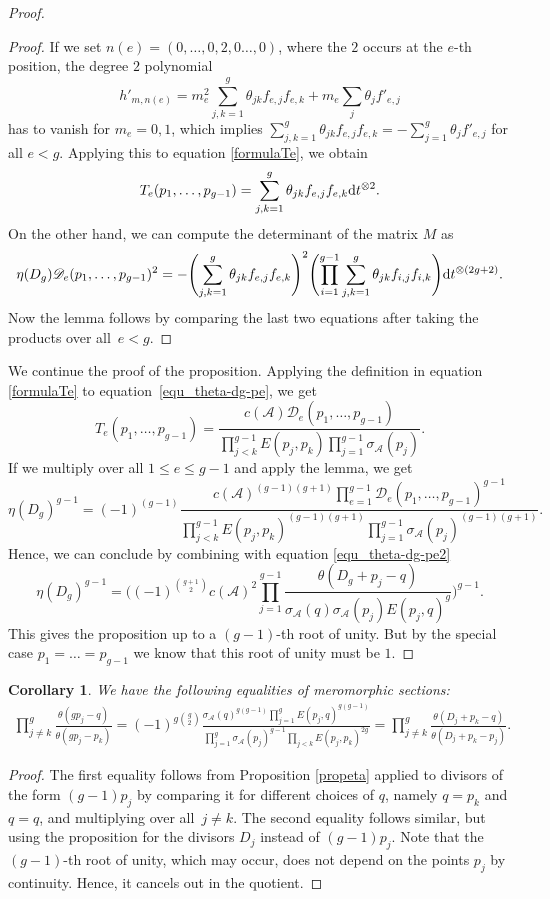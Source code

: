\documentclass[10pt,a4paper]{amsart}
\numberwithin{equation}{section}
\newtheorem{Corollary}[Theorem]{Corollary}
\begin{document}
\begin{proof}
\begin{proof}
		If we set $n(e)=(0,\dots,0,2,0\dots,0)$, where the $2$ occurs at the $e$-th position, the degree $2$ polynomial
		\[h'_{m,n(e)}=m_e^2\sum_{j,k=1}^g \theta_{jk} f_{e,j} f_{e,k}+m_e\sum_{j}\theta_j f'_{e,j}\]
		has to vanish for $m_e=0,1$, which implies $\sum_{j,k=1}^g \theta_{jk} f_{e,j} f_{e,k}=-\sum_{j=1}^g\theta_j f'_{e,j}$ for all $e<g$. Applying this to equation \eqref{formulaTe}, we obtain
		\[T_e(p_1,\dots,p_{g-1})=\sum_{j,k=1}^g \theta_{jk}f_{e,j}f_{e,k}{\rm d}t^{\otimes 2}.\]
		On the other hand, we can compute the determinant of the matrix $M$ as
		\[\eta(D_g)\mathscr{D}_e(p_1,\dots,p_{g-1})^2=-\Biggl(\sum_{j,k=1}^g \theta_{jk}f_{e,j}f_{e,k}\Biggr)^2\Biggl(\prod_{i=1}^{g-1} \sum_{j,k=1}^g \theta_{jk}f_{i,j}f_{i,k}\Biggr){\rm d}t^{\otimes(2g+2)}.\]
		Now the lemma follows by comparing the last two equations after taking the products over all~${e<g}$.
	\end{proof}

	We continue the proof of the proposition.
	Applying the definition in equation \eqref{formulaTe} to equation~\eqref{equ_theta-dg-pe}, we get
	\[T_e(p_1,\dots,p_{g-1})=\frac{c(\mathcal{A})\mathscr{D}_e(p_1,\dots,p_{g-1})}{\prod_{j< k}^{g-1}E(p_j,p_k)\prod_{j=1}^{g-1}\sigma_{\mathcal{A}}(p_j)}.\]
	If we multiply over all $1\le e\le g-1$ and apply the lemma, we get \[\eta(D_g)^{g-1}=(-1)^{(g-1)}\frac{c(\mathcal{A})^{(g-1)(g+1)}\prod_{e=1}^{g-1}\mathscr{D}_e(p_1,\dots,p_{g-1})^{g-1}}{\prod_{j<k}^{g-1}E(p_j,p_k)^{(g-1)(g+1)}\prod_{j=1}^{g-1}\sigma_{\mathcal{A}}(p_j)^{(g-1)(g+1)}}.\]
	Hence, we can conclude by combining with equation \eqref{equ_theta-dg-pe2} \[\eta(D_g)^{g-1}=\Biggl((-1)^{\binom{g+1}{2}}c(\mathcal{A})^2\prod_{j=1}^{g-1}\frac{\theta(D_g+p_j-q)}{\sigma_{\mathcal{A}}(q)\sigma_{\mathcal{A}}(p_j)E(p_j,q)^g}\Biggr)^{g-1}.\]
	This gives the proposition up to a $(g-1)$-th root of unity. But by the special case $p_1=\dots=p_{g-1}$ we know that this root of unity must be $1$.
\end{proof}

\begin{Corollary}\label{cortheta}
	We have the following equalities of meromorphic sections:
	\begin{align*}
		\prod_{j\neq k}^g\frac{\theta(gp_j-q)}{\theta(gp_j-p_k)}=(-1)^{g\binom{g}{2}}\frac{\sigma_{\mathcal{A}}(q)^{g(g-1)}\prod_{j=1}^gE(p_j,q)^{g(g-1)}}{\prod_{j=1}^g\sigma_{\mathcal{A}}(p_j)^{g-1}\prod_{j<k}E(p_j,p_k)^{2g}}=\prod_{j\neq k}^g\frac{\theta(D_j+p_k-q)}{\theta(D_j+p_k-p_j)}.
	\end{align*}
\end{Corollary}
\begin{proof}
	The first equality follows from Proposition \ref{propeta} applied to divisors of the form $(g-1)p_j$ by comparing it for different choices of $q$, namely $q=p_k$ and $q=q$, and multiplying over all~${j\neq k}$. The second equality follows similar, but using the proposition for the divisors $D_j$ instead of $(g-1)p_j$. Note that the $(g-1)$-th root of unity, which may occur, does not depend on the points $p_j$ by continuity. Hence, it cancels out in the quotient.
\end{proof}
\end{document}

